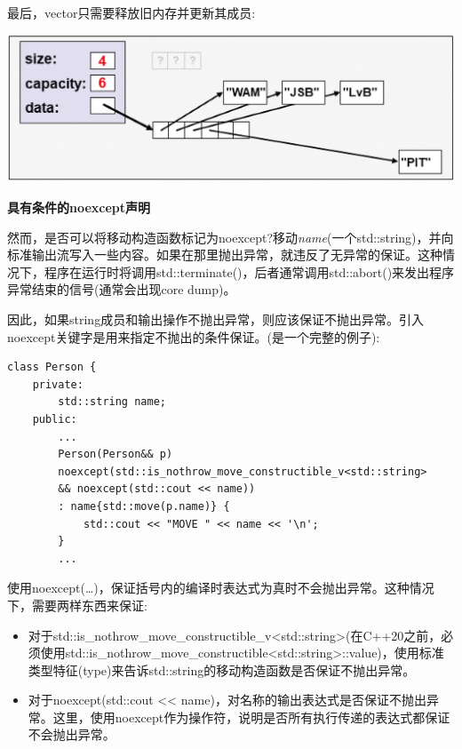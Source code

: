 最后，vector只需要释放旧内存并更新其成员:\par

\begin{center}
	\includegraphics[width=1.0\textwidth]{content/1/chapter7/images/6}
\end{center}

\hspace*{\fill} \par %
\textbf{具有条件的noexcept声明}

然而，是否可以将移动构造函数标记为noexcept?移动\textit{name}(一个std::string)，并向标准输出流写入一些内容。如果在那里抛出异常，就违反了无异常的保证。这种情况下，程序在运行时将调用std::terminate()，后者通常调用std::abort()来发出程序异常结束的信号(通常会出现core dump)。\par

因此，如果string成员和输出操作不抛出异常，则应该保证不抛出异常。引入noexcept关键字是用来指定不抛出的条件保证。({\color{red}{basics/personcond.hpp}}是一个完整的例子):\par

\begin{lstlisting}[caption={}]
class Person {
	private:
		std::string name;
	public:
		...
		Person(Person&& p)
		noexcept(std::is_nothrow_move_constructible_v<std::string>
		&& noexcept(std::cout << name))
		: name{std::move(p.name)} {
			std::cout << "MOVE " << name << '\n';
		}
		...
\end{lstlisting}

使用noexcept(…)，保证括号内的编译时表达式为真时不会抛出异常。这种情况下，需要两样东西来保证:\par

\begin{itemize}
	\item 对于std::is\_nothrow\_move\_constructible\_v<std::string>(在C++20之前，必须使用std::is\_nothrow\_move\_constructible<std::string>::value)，使用标准类型特征(type)来告诉std::string的移动构造函数是否保证不抛出异常。
	\item 对于noexcept(std::cout << name)，对名称的输出表达式是否保证不抛出异常。这里，使用noexcept作为操作符，说明是否所有执行传递的表达式都保证不会抛出异常。
\end{itemize}

